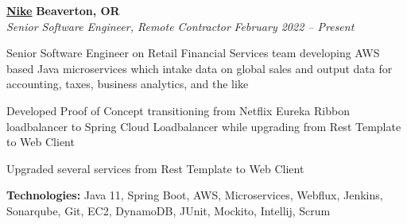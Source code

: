 %
    \headerrow
        {\textbf{\href{https://www.nike.com/}{Nike}}}
        {\textbf{Beaverton, OR}}
    \\
    \headerrow
        {\emph{Senior Software Engineer, Remote Contractor}}
        {\emph{February 2022 -- Present}}
    \begin{itemize*}
        \item Senior Software Engineer on Retail Financial Services team developing AWS based Java microservices which intake data on global sales and output data for accounting, taxes, business analytics, and the like
        \item Developed Proof of Concept transitioning from Netflix Eureka Ribbon loadbalancer to Spring Cloud Loadbalancer while upgrading from Rest Template to Web Client
        \item Upgraded several services from Rest Template to Web Client
    \end{itemize*}

    \hspace{1.0em}
        {\textbf{Technologies:} Java 11, Spring Boot, AWS, Microservices, Webflux, Jenkins, Sonarqube, Git, EC2, DynamoDB, JUnit, Mockito, Intellij, Scrum}

